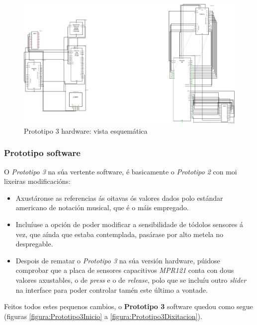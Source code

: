   \begin{figure}[htbp]
   \centering
   \includegraphics[scale=30.0,keepaspectratio=true]{./imagenes/prototipo3_esquema.png}
   \caption{Prototipo 3 hardware: vista esquemática}
   \label{figura:Prototipo3HardwareEsquema}
  \end{figure}

  \subsubsection{Prototipo software}

  O \textit{Prototipo 3} na súa vertente software, é basicamente o
  \textit{Prototipo 2} con moi lixeiras modificacións:

  \begin{itemize}
   \item Axustáronse as referencias ás oitavas ós valores dados polo estándar
         americano de notación musical, que é o máis empregado.
   \item Incluíuse a opción de poder modificar a sensibilidade de tódolos
         sensores á vez, que aínda que estaba contemplada, pasárase por alto
         metela no despregable.
   \item Despois de rematar o \textit{Prototipo 3} na súa versión hardware,
         púidose comprobar que a placa de sensores capacitivos \textit{MPR121}
         conta con dous valores axustables, o de \textit{press} e o de
         \textit{release}, polo que se incluíu outro \textit{slider} na
         interface para poder controlar tamén este último a vontade.
  \end{itemize}

  Feitos todos estes pequenos cambios, o \textbf{Prototipo 3} software quedou
  como segue (figuras \ref{figura:Prototipo3Inicio} a 
  \ref{figura:Prototipo3Dixitacion}).

